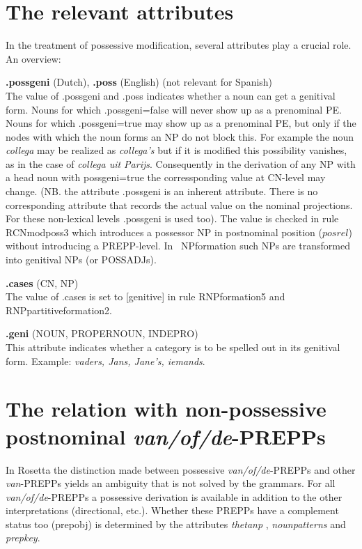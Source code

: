 \section{The relevant attributes}

In the treatment of possessive modification, several attributes play a crucial 
role. An overview:

\begin{description}
  \item {\bf .possgeni} (Dutch), {\bf .poss} (English) (not relevant for 
Spanish)\\
The value of .possgeni and .poss indicates whether a noun can get a genitival form. 
Nouns for which .possgeni=false will never show up as a prenominal PE.
Nouns for which .possgeni=true may show up as a prenominal PE, but only if 
the nodes with which the noun forms an NP do not block this.
For example the noun {\em collega} may be realized as {\em collega's} 
but if 
it is modified this possibility vanishes, as in the case of 
{\em collega uit Parijs}. Consequently 
in the derivation of any NP with a head noun with possgeni=true
the corressponding value at CN-level may change. (NB. the attribute 
.possgeni is an inherent attribute. 
There is no corresponding attribute that records the actual value on the 
nominal projections. For these non-lexical levels .possgeni is used too).
The value is checked in rule RCNmodposs3    
which introduces a possessor NP in postnominal position
($posrel$) without introducing a PREPP-level. In \sg \ NPformation such NPs are 
transformed into genitival NPs (or POSSADJs).



  \item {\bf .cases} (CN, NP)\\
The value of .cases is set to [genitive] in rule RNPformation5 and 
RNPpartitiveformation2.
\item {\bf .geni}  (NOUN, PROPERNOUN, INDEPRO) \\ 
This attribute indicates whether a category is to be spelled out in its 
genitival form. Example: {\em vaders, Jans,  Jane's, iemands}.


\end{description}


\section{The relation with non-possessive postnominal {\em van/of/de}-PREPPs}

In Rosetta the distinction made between possessive 
{\em van/of/de}-PREPPs and other {\em van}-PREPPs yields 
an ambiguity that is 
not solved by the grammars. 
For all {\em van/of/de}-PREPPs 
a possessive derivation is available in addition to the other 
interpretations (directional, etc.).
Whether these PREPPs have  a complement status too (prepobj)
is determined by the attributes {\em thetanp} , {\em nounpatterns} and {\em 
prepkey}.\\

